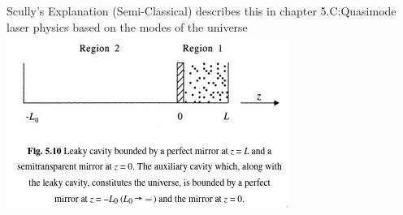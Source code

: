 \begin{frame}{Scully's Explanation (Semi-Classical)}
     \citep{Scully1997} describes this in chapter 5.C:Quasimode laser physics based on the modes of the universe
    \includegraphics{scully/scully_universe_mirrors.png}
\end{frame}


